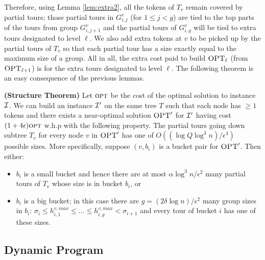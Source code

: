 \documentclass[twoside,leqno]{article}
\newcommand{\calI}{{\cal I}}
\newcommand{\opt}{\mbox{\sc opt}}
\newcommand{\OPT}{\mbox{\sc OPT}}
\newcommand{\eps}{\epsilon}
\begin{document}
Therefore, using Lemma \ref{lem:extra2}, all the tokens of $T_v$ remain covered by partial tours;
those partial tours in $G^v_{i,j}$ (for $1\leq j<g$) are tied to the top parts of the tours from group $G^v_{i,j+1}$ and the
partial tours of $G^v_{i,g}$ will be tied to extra tours designated to level $\ell$. We also add extra tokens at $v$ to be
picked up by the partial tours of $T_v$ so that each partial tour has a size exactly equal to the maximum size of a group.
All in all, the extra cost paid to build $\OPT_\ell$ (from $\OPT_{\ell+1}$) is for the extra tours designated to level $\ell$.
The following theorem is an easy consequence of the previous lemmas.

\begin{theorem}\label{lem:struct1} \textbf{(Structure Theorem)}
Let $\opt$ be the cost of the optimal solution to instance $\calI$. We can build an instance $\calI'$ on the same tree $T$
such that each node has $\geq 1$ tokens and there exists a near-optimal solution $\OPT'$ for $\calI'$
having cost $(1 + 4\eps)\opt$ w.h.p with the following property.
The partial tours going down subtree $T_v$ for every node $v$ in $\OPT'$ has one of $O((\log Q \log^3 n)/\eps^3)$ possible sizes.
More specifically, suppose $(v,b_i)$ is a bucket pair for $\OPT'$. Then either:
\begin{itemize}
\item $b_i$ is a small bucket and hence there are at most $\alpha \log^3 n/\eps^2$ many partial tours of $T_v$ whose size is in bucket $b_i$, or
\item $b_i$ is a big bucket; in this case there are $g = (2\delta \log n)/\eps^2 $ many group sizes in $b_i$: 
$\sigma_i \leq h^{v,max}_{i,1}\leq \ldots\leq h^{v,max}_{i,g}<\sigma_{i+1}$ and every tour of bucket $i$ has one of these sizes. 
\end{itemize}
\end{theorem}


\subsection{Dynamic Program}
\end{document}
